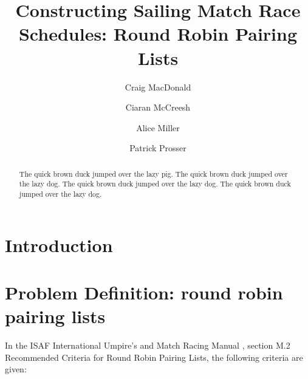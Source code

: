 \documentclass{llncs}
\begin{document}
\title{Constructing Sailing Match Race Schedules: Round Robin Pairing Lists}
\author{Craig MacDonald \and Ciaran McCreesh \and Alice Miller \and Patrick Prosser}
\maketitle

\begin{abstract} 
The quick brown duck jumped over the lazy pig. The quick brown duck jumped over the lazy dog. The quick brown duck jumped over the lazy dog. The quick brown duck jumped over the lazy dog.
\end{abstract}

\section{Introduction}

\section{Problem Definition: round robin pairing lists}
In the ISAF International Umpire's and Match Racing Manual \cite{isaf}, section
M.2 Recommended Criteria for Round Robin Pairing Lists, the following criteria
are given:
\end{document}
